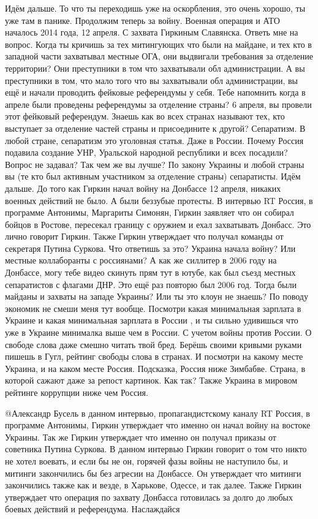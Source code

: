\begin{multicols}{2}
\begin{itemize}
Идём дальше. То что ты переходишь уже на оскорбления, это очень хорошо,  ты уже
там в панике. Продолжим теперь за войну. Военная операция и АТО началось 2014
года, 12 апреля. С захвата Гиркиным Славянска. Ответь мне на вопрос. Когда ты
кричишь за тех митингующих что были на майдане, и тех кто в западной части
захватывал местные ОГА, они выдвигали требования за отделение территории? Они
преступники в том что захватывали обл администрации. А вы преступники в том,
что мало того что вы захватывали обл администрации, вы ещё и начали проводить
фейковые референдумы у себя. Тебе напомнить когда в апреле были проведены
референдумы за отделение страны? 6 апреля, вы провели этот фейковый референдум.
Знаешь как во всех странах называют тех, кто выступает за отделение частей
страны и присоедините к другой? Сепаратизм. В любой стране, сепаратизм это
уголовная статья. Даже в России. Почему Россия подавила создание УНР, Уральской
народной республики и всех посадили? Вопрос не задавал? Так чем же вы лучше? По
закону Украины и любой страны вы (те кто был активным участником за отделение
страны)  сепаратисты. Идём дальше. До того как Гиркин начал войну на Донбассе
12 апреля, никаких военных действий не было. А были беззубые протесты. В
интервью RT Россия, в программе Антонимы, Маргариты Симонян, Гиркин заявляет
что он собирал бойцов в Ростове, пересекал границу с оружием и ехал захватывать
Донбасс. Это лично говорит Гиркин. Также Гиркин утверждает что получал команды
от секретаря Путина Суркова. Что ответишь за это? Украина начала войну? Или
местные коллаборанты с россиянами? А как же силлитер в 2006 году на Донбассе,
могу тебе видео скинуть прям тут в ютубе, как был съезд местных сепаратистов с
флагами ДНР. Это ещё раз повторю был 2006 год. Тогда были майданы и захваты на
западе Украины? Или ты это клоун не знаешь? По поводу экономик не смеши меня
тут вообще. Посмотри какая минимальная зарплата в Украине и какая минимальная
зарплата в России , и ты сильно удивишься что уже в Украине минималка выше чем
в России. С учетом войны против России. О свободе слова даже смешно читать твой
бред. Берёшь своими кривыми руками пишешь в Гугл, рейтинг свободы слова в
странах. И посмотри на какому месте Украина, и на каком месте Россия.
Подсказка, Россия ниже Зимбабве. Страна, в которой сажают даже за репост
картинок. Как так? Также Украина в мировом рейтинге коррупции ниже чем Россия. 


@Александр Бусель   в данном интервью, пропагандистскому каналу RT Россия, в
программе Антонимы, Гиркин утверждает что именно он начал войну на востоке
Украины. Так же Гиркин утверждает что именно он получал приказы от советника
Путина Суркова. В данном интервью Гиркин говорит о том что никто не хотел
воевать, и если бы не он, горячей фазы войны не наступило бы, и митинги
закончились бы без агресии на Донбассе. Он утверждает что митинги закончились
также как и везде, в Харькове, Одессе, и так далее. Также Гиркин утверждает
что операция по захвату Донбасса готовилась за долго до любых боевых действий
и референдума. Наслаждайся


\end{itemize}
\end{multicols}
